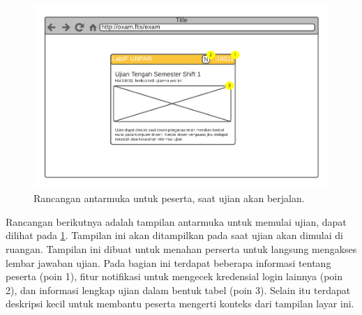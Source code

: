     \begin{figure}
        \centering
        \includegraphics[width=0.7\paperwidth]{Gambar/mockups/Mockup--Peserta - Prestartstate.pdf}
        \caption{Rancangan antarmuka untuk peserta, saat ujian akan berjalan.}
        \label{fig:mockup_peserta_prestartstate}
    \end{figure}
    Rancangan berikutnya adalah tampilan antarmuka untuk memulai ujian, dapat
    dilihat pada \ref{fig:mockup_peserta_prestartstate}. Tampilan ini akan
    ditampilkan pada saat ujian akan dimulai di ruangan. Tampilan ini dibuat
    untuk menahan perserta untuk langsung mengakses lembar jawaban ujian. Pada
    bagian ini terdapat beberapa informasi tentang peserta (poin 1), fitur
    notifikasi untuk mengecek kredensial login lainnya (poin 2), dan informasi
    lengkap ujian dalam bentuk tabel (poin 3). Selain itu terdapat deskripsi
    kecil untuk membantu peserta mengerti konteks dari tampilan layar ini. 
    
